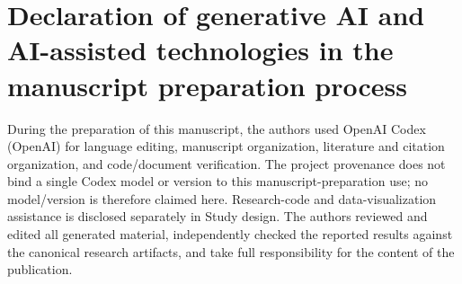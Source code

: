 \documentclass[preprint,11pt,authoryear]{elsarticle}          %
\begin{document}
\section*{Declaration of generative AI and AI-assisted technologies in the manuscript preparation process}

\begin{sloppypar}
During the preparation of this manuscript, the authors used OpenAI Codex (OpenAI) for language editing, manuscript organization, literature and citation organization, and code/document verification. The project provenance does not bind a single Codex model or version to this manuscript-preparation use; no model/version is therefore claimed here. Research-code and data-visualization assistance is disclosed separately in Study design. The authors reviewed and edited all generated material, independently checked the reported results against the canonical research artifacts, and take full responsibility for the content of the publication.
\end{sloppypar}



\end{document}
